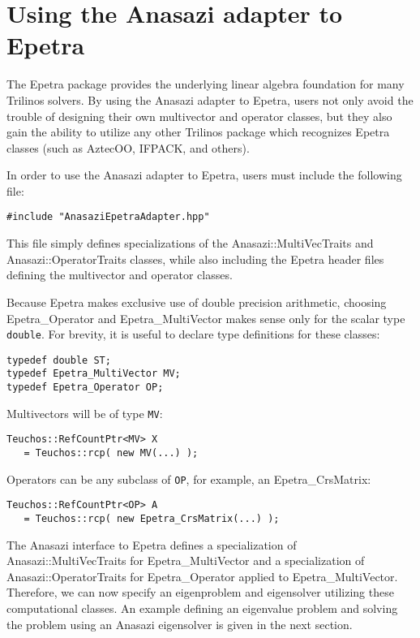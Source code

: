 \section{Using the Anasazi adapter to Epetra}
\label{sec:anasazi:epetra}

The Epetra package provides the underlying linear algebra foundation for many
Trilinos solvers.  By using the Anasazi adapter to Epetra, users not only
avoid the trouble of designing their own multivector and operator classes, but
they also gain the ability to utilize any other Trilinos package which
recognizes Epetra classes (such as AztecOO, IFPACK, and others).

In order to use the Anasazi adapter to Epetra, users must include the following
file:
\begin{verbatim}
#include "AnasaziEpetraAdapter.hpp"
\end{verbatim}
This file simply defines specializations of the Anasazi::MultiVecTraits
and Anasazi::OperatorTraits classes, while also including the Epetra
header files defining the multivector and operator classes.

Because Epetra makes exclusive use of double precision arithmetic, choosing
Epetra\_Operator and Epetra\_MultiVector makes sense only for the
scalar type \verb!double!. For brevity, it is useful to declare type definitions
for these classes:
\begin{verbatim}
typedef double ST;
typedef Epetra_MultiVector MV;
typedef Epetra_Operator OP;
\end{verbatim}

\noindent Multivectors will be of type \verb!MV!:
\begin{verbatim}
Teuchos::RefCountPtr<MV> X 
   = Teuchos::rcp( new MV(...) );
\end{verbatim}

\noindent Operators can be any subclass of \verb!OP!, for example, an Epetra\_CrsMatrix:
\begin{verbatim}
Teuchos::RefCountPtr<OP> A 
   = Teuchos::rcp( new Epetra_CrsMatrix(...) );
\end{verbatim}

The Anasazi interface to Epetra defines a specialization of
Anasazi::MultiVecTraits for Epetra\_MultiVector and a
specialization of Anasazi::OperatorTraits for Epetra\_Operator
applied to Epetra\_MultiVector. Therefore, we can now specify an
eigenproblem and eigensolver utilizing these computational classes. An example
defining an eigenvalue problem and solving the problem using an Anasazi
eigensolver is given in the next section.

